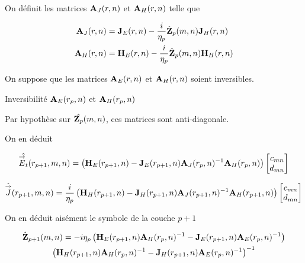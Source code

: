         On définit les matrices \(\mathbf{A}_{J}(r,n)\) et \(\mathbf{A}_{H}(r,n)\) telle que

        \begin{align}
            \mathbf{A}_{J}(r,n) &= \mathbf{J}_{E}(r,n) - \dfrac{i}{\eta_p}\hat{\mathbf{Z}}_p(m,n)\mathbf{J}_{H}(r,n)
            \\
            \mathbf{A}_{H}(r,n) &= \mathbf{H}_{E}(r,n) - \dfrac{i}{\eta_p}\hat{\mathbf{Z}}_p(m,n)\mathbf{H}_{H}(r,n)
        \end{align}

        On suppose que les matrices \(\mathbf{A}_{E}(r,n)\) et \(\mathbf{A}_{H}(r,n)\) soient inversibles.

        \begin{TODO}
          Inversibilité \(\mathbf{A}_{E}(r_p,n)\) et \(\mathbf{A}_{H}(r_p,n)\)
        \end{TODO}

        Par hypothèse sur \(\hat{\mathbf{Z}_p}(m,n)\), ces matrices sont anti-diagonale.

        On en déduit

        \begin{equation}
            \hat{{\overset{\rightarrow}{E}}_t}(r_{p+1},m,n) = 
            \left(
                \mathbf{H}_{E}(r_{p+1},n)
                -
                \mathbf{J}_{E}(r_{p+1},n)
                \mathbf{A}_{J}(r_p,n)^{-1}
                \mathbf{A}_{H}(r_p,n)
            \right)
            \begin{bmatrix}
                c_{mn}
                \\
                d_{mn}
            \end{bmatrix}
        \end{equation}


        \begin{equation}
            \hat{{\overset{\rightarrow}{J}}}(r_{p+1},m,n) = \dfrac{i}{\eta_p}
            \left(
                \mathbf{H}_{H}(r_{p+1},n)
                -
                \mathbf{J}_{H}(r_{p+1},n)
                \mathbf{A}_{J}(r_{p+1},n)^{-1}
                \mathbf{A}_{H}(r_{p+1},n)
            \right)
            \begin{bmatrix}
                c_{mn}
                \\
                d_{mn}
            \end{bmatrix}
        \end{equation}

        On en déduit aisément le symbole de la couche \(p+1\)

        \begin{multline}
            \hat{\mathbf{Z}}_{p+1}(m,n) = -i\eta_p
            \left(
                \mathbf{H}_{E}(r_{p+1},n)
                \mathbf{A}_{H}(r_p,n)^{-1}
                -
                \mathbf{J}_{E}(r_{p+1},n)
                \mathbf{A}_{E}(r_p,n)^{-1}
            \right)
            \\
            \left(
                \mathbf{H}_{H}(r_{p+1},n)
                \mathbf{A}_{H}(r_p,n)^{-1}
                -
                \mathbf{J}_{H}(r_{p+1},n)
                \mathbf{A}_{E}(r_p,n)^{-1}
            \right)^{-1}
        \end{multline}

